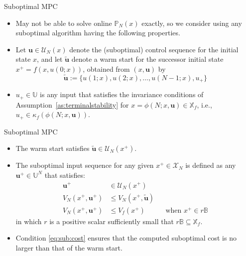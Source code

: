 \documentclass{beamer}
\newcommand{\bbX}{\mathbb{X}}
\newcommand{\bbU}{\mathbb{U}}
\newcommand{\bbP}{\mathbb{P}}
\newcommand{\bbB}{\mathbb{B}}
\newcommand{\useq}{\mathbf{u}}
\newcommand{\mc}{\mathcal}
\begin{document}
\begin{frame}{Suboptimal MPC}

\begin{itemize}
\item May not be able to solve online $\bbP_N(x)$ \alert{exactly}, so
  we consider using \alert{any} 
suboptimal algorithm having the following properties.

\item Let $\useq\in\mc{U}_N(x)$ denote the (suboptimal) control sequence for
the initial state $x$, and let $\tilde{\useq}$ denote a \alert{warm
start} for the successor initial state $x^+ = f(x,u(0; x))$, obtained
from $(x,\useq)$ by
\begin{equation}\label{eq:warm}
 \tilde{\useq} := \{u(1; x),u(2; x), \ldots, u(N-1; x), u_+\}
\end{equation}

\item  $u_+ \in\bbU$ is any input that satisfies the
invariance conditions of Assumption~\ref{as:terminalstability} for  
$x = \phi(N;x, \useq) \in \bbX_f$, i.e., $u_+ \in \kappa_f(\phi(N;x, \useq))$. 
\end{itemize}
\end{frame}

\begin{frame}{Suboptimal MPC}

\begin{itemize}

\item The warm start satisfies $\tilde{\useq} \in \mc{U}_N
(x^+)$. 

\item The suboptimal input sequence for any given $x^+ \in
\mc{X}_N$ is defined as \alert{any} $\useq^+ \in  \bbU^N$ that 
satisfies:
\begin{subequations}\label{eq:sub}
\begin{align}
 \useq^+ &\in \mc{U}_N(x^+) & & \label{eq:sub:feas} \\
 V_N(x^+,\useq^+) &\leq V_N(x^+,\tilde{\useq}) & &  \label{eq:sub:cost} \\
 V_N(x^+,\useq^+) &\leq V_f(x^+) & & \text{when } x^+ \in r\bbB \label{eq:sub:ball}
\end{align}
\end{subequations}
in which $r$ is a positive scalar sufficiently small that $r\bbB
\subseteq \bbX_f$.  


\item Condition \eqref{eq:sub:cost} ensures that the computed suboptimal
cost is no larger than that of the warm start.
\end{itemize}
\end{frame}
\end{document}
